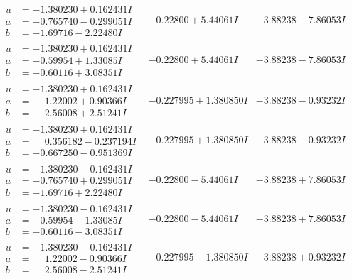 \documentclass[1p]{elsarticle_modified}
\theoremstyle{definition}
\begin{document}
$$\begin{array}{c|c|c}
\begin{aligned}
u &= -1.380230 + 0.162431 I \\
a &= -0.765740 - 0.299051 I \\
b &= -1.69716 - 2.22480 I\end{aligned}
 & -0.22800 + 5.44061 I & -3.88238 - 7.86053 I \\ \hline\begin{aligned}
u &= -1.380230 + 0.162431 I \\
a &= -0.59954 + 1.33085 I \\
b &= -0.60116 + 3.08351 I\end{aligned}
 & -0.22800 + 5.44061 I & -3.88238 - 7.86053 I \\ \hline\begin{aligned}
u &= -1.380230 + 0.162431 I \\
a &= \phantom{-}1.22002 + 0.90366 I \\
b &= \phantom{-}2.56008 + 2.51241 I\end{aligned}
 & -0.227995 + 1.380850 I & -3.88238 - 0.93232 I \\ \hline\begin{aligned}
u &= -1.380230 + 0.162431 I \\
a &= \phantom{-}0.356182 - 0.237194 I \\
b &= -0.667250 - 0.951369 I\end{aligned}
 & -0.227995 + 1.380850 I & -3.88238 - 0.93232 I \\ \hline\begin{aligned}
u &= -1.380230 - 0.162431 I \\
a &= -0.765740 + 0.299051 I \\
b &= -1.69716 + 2.22480 I\end{aligned}
 & -0.22800 - 5.44061 I & -3.88238 + 7.86053 I \\ \hline\begin{aligned}
u &= -1.380230 - 0.162431 I \\
a &= -0.59954 - 1.33085 I \\
b &= -0.60116 - 3.08351 I\end{aligned}
 & -0.22800 - 5.44061 I & -3.88238 + 7.86053 I \\ \hline\begin{aligned}
u &= -1.380230 - 0.162431 I \\
a &= \phantom{-}1.22002 - 0.90366 I \\
b &= \phantom{-}2.56008 - 2.51241 I\end{aligned}
 & -0.227995 - 1.380850 I & -3.88238 + 0.93232 I \\ \hline\begin{aligned}

\end{aligned}
\end{array}$$
\end{document}
